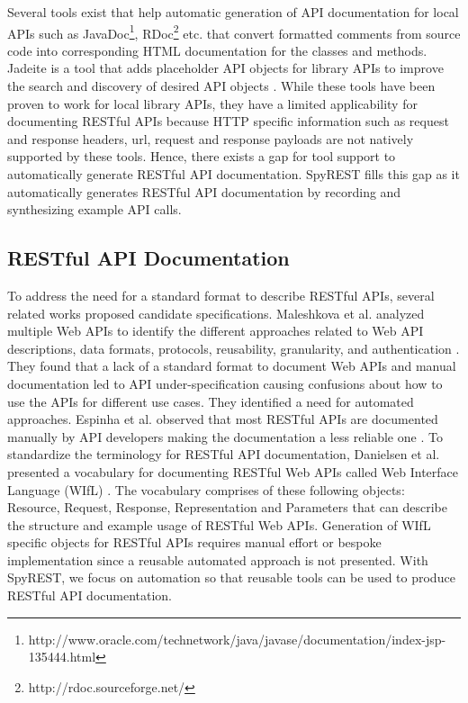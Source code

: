 \documentclass[conference]{IEEEtran}
\begin{document}
Several tools exist that help automatic generation of API documentation for local APIs such as JavaDoc\footnote{http://www.oracle.com/technetwork/java/javase/documentation/index-jsp-135444.html}, RDoc\footnote{http://rdoc.sourceforge.net/} etc. that convert formatted comments from source code into corresponding HTML documentation for the classes and methods. Jadeite is a tool that adds placeholder API objects for library APIs to improve the search and discovery of desired API objects \cite{Jadeite}. While these tools have been proven to work for local library APIs, they have a limited applicability for documenting RESTful APIs because HTTP specific information such as request and response headers, url, request and response payloads are not natively supported by these tools. Hence, there exists a gap for tool support to automatically generate RESTful API documentation. SpyREST fills this gap as it automatically generates RESTful API documentation by recording and synthesizing example API calls.

\subsection{RESTful API Documentation} %
\label{sub:restful_api_documentation}

To address the need for a standard format to describe RESTful APIs, several related works proposed candidate specifications. Maleshkova et al. analyzed multiple Web APIs to identify the different approaches related to Web API descriptions, data formats, protocols, reusability, granularity, and authentication \cite{Maleshkova_investigating}. They found that a lack of a standard format to document Web APIs and manual documentation led to API under-specification causing confusions about how to use the APIs for different use cases. They identified a need for automated approaches. Espinha et al. observed that most RESTful APIs are documented manually by API developers making the documentation a less reliable one \cite{Espinha_web}. To standardize the terminology for RESTful API documentation, Danielsen et al. presented a vocabulary for documenting RESTful Web APIs called Web Interface Language (WIfL) \cite{Danielsen_validation}. The vocabulary comprises of these following objects: Resource, Request, Response, Representation and Parameters that can describe the structure and example usage of RESTful Web APIs. Generation of WIfL specific objects for RESTful APIs requires manual effort or bespoke implementation since a reusable automated approach is not presented. With SpyREST, we focus on automation so that reusable tools can be used to produce RESTful API documentation.
\end{document}
